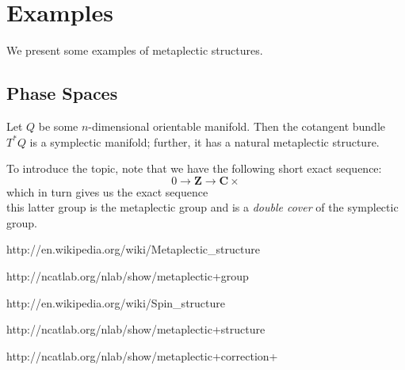 








\section{Examples}
We present some examples of metaplectic structures.

\subsection{Phase Spaces}
Let $Q$ be some $n$-dimensional orientable manifold. Then the cotangent bundle $T^*Q$ is a symplectic manifold; further, it has a natural metaplectic structure.



















To introduce the topic, note that we have the following short exact sequence:
$$
0 \to \mathbf{Z} \to \mathbf{C} \times 
$$
which in turn gives us the exact sequence
$$
$$
this latter group is the metaplectic group and is a \textit{double cover} of the symplectic group.

http://en.wikipedia.org/wiki/Metaplectic_structure

http://ncatlab.org/nlab/show/metaplectic+group

http://en.wikipedia.org/wiki/Spin_structure

http://ncatlab.org/nlab/show/metaplectic+structure

http://ncatlab.org/nlab/show/metaplectic+correction+%